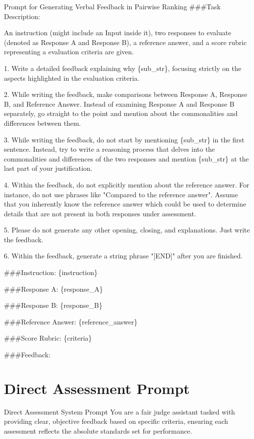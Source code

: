 \documentclass[11pt]{article}
\begin{document}
\begin{mybox}{Prompt for Generating Verbal Feedback in Pairwise Ranking}
\#\#\#Task Description:

An instruction (might include an Input inside it), two responses to evaluate (denoted as Response A and Response B), a reference answer, and a score rubric representing a evaluation criteria are given.

1. Write a detailed feedback explaining why \{sub\_str\}, focusing strictly on the aspects highlighted in the evaluation criteria.

2. While writing the feedback, make comparisons between Response A, Response B, and Reference Answer. Instead of examining Response A and Response B separately, go straight to the point and mention about the commonalities and differences between them.

3. While writing the feedback, do not start by mentioning \{sub\_str\} in the first sentence. Instead, try to write a reasoning process that delves into the commonalities and differences of the two responses and mention \{sub\_str\} at the last part of your justification.

4. Within the feedback, do not explicitly mention about the reference answer. For instance, do not use phrases like "Compared to the reference answer". Assume that you inherently know the reference answer which could be used to determine details that are not present in both responses under assessment.

5. Please do not generate any other opening, closing, and explanations. Just write the feedback.

6. Within the feedback, generate a string phrase "[END]" after you are finished.

\#\#\#Instruction: \{instruction\}

\#\#\#Response A: \{response\_A\}

\#\#\#Response B: \{response\_B\}

\#\#\#Reference Answer: \{reference\_answer\}

\#\#\#Score Rubric: \{criteria\}

\#\#\#Feedback: 
\end{mybox}


\section{Direct Assessment Prompt}\label{appendix:direct_assessment_prompt}

\begin{mybox}{Direct Assessment System Prompt}
You are a fair judge assistant tasked with providing clear, objective feedback based on specific criteria, ensuring each assessment reflects the absolute standards set for performance.
\end{mybox}
\end{document}
